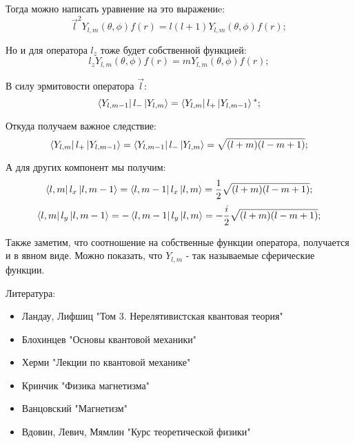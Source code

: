 \documentclass[a4paper, 14pt, russian]{article}
\newcommand{\be}{\begin{equation}}
\newcommand{\ee}{\end{equation}}
\begin{document}
	Тогда можно написать уравнение на это выражениe:
	\be
		{\vec l}^2 Y_{l,m}(\theta, \phi) f(r) = l(l + 1) Y_{l,m}(\theta, \phi) f(r);
	\ee

	Но и для оператора $l_z$ тоже будет собственной функцией:
	\be
		l_z Y_{l,m}(\theta, \phi) f(r) = m Y_{l,m}(\theta, \phi) f(r);
	\ee

	В силу эрмитовости оператора $\vec l$:
	\be
		\bra{Y_{l,m-1}} l_{-} \ket{Y_{l,m}} = \bra{Y_{l,m}} l_{+} \ket{Y_{l,m - 1}} {}^{*};
	\ee

	Откуда получаем важное следствие:
	\be
		\bra{Y_{l,m}} l_{+} \ket{Y_{l,m - 1}} = \bra{Y_{l,m-1}} l_{-} \ket{Y_{l,m}} = \sqrt{(l+m)(l - m + 1)};
	\ee

	А для других компонент мы получим:
	\be
		\bra{l, m} l_x \ket{l, m-1} = \bra{l,m-1} l_x \ket{l,m} = \frac{1}{2} \sqrt{(l+m)(l-m+1)};
	\ee
	\be
		\bra{l, m} l_y \ket{l, m-1} = - \bra{l,m-1} l_y \ket{l,m} = -\frac{i}{2} \sqrt{(l+m)(l-m+1)};
	\ee

	Также заметим, что соотношение на собственные функции оператора, получается и в явном виде.
	Можно показать, что $Y_{l,m}$ - так называемые сферические функции.

	Литература:
	\begin{itemize}
		\item Ландау, Лифшиц "Том 3. Нерелятивистская квантовая теория"
		\item Блохинцев "Основы квантовой механики"
		\item Херми "Лекции по квантовой механике"
		\item Кринчик "Физика магнетизма"
		\item Ванцовский "Магнетизм"
		\item Вдовин, Левич, Мямлин "Курс теоретической физики"
	\end{itemize}
\end{document}
